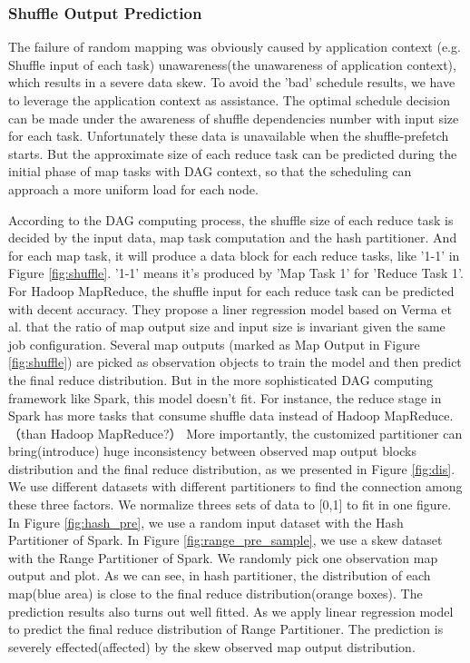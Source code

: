 \subsubsection{Shuffle Output Prediction}\label{shuffleprediction}
The failure of random mapping was obviously caused by application context (e.g. Shuffle input of each task) unawareness(the unawareness of application context), which results in a severe data skew. To avoid the 'bad' schedule results, we have to leverage the application context as assistance. The optimal schedule decision can be made under the awareness of shuffle dependencies number with input size for each task. Unfortunately these data is unavailable when the shuffle-prefetch starts. But the approximate size of each reduce task can be predicted during the initial phase of map tasks with DAG context, so that the scheduling can approach a more uniform load for each node.

According to the DAG computing process, the shuffle size of each reduce task is decided by the input data, map task computation and the hash partitioner. And for each map task, it will produce a data block for each reduce tasks, like '1-1' in Figure \ref{fig:shuffle}. '1-1' means it's produced by 'Map Task 1' for 'Reduce Task 1'. For Hadoop MapReduce, the shuffle input for each reduce task can be predicted with decent accuracy\cite{ishuffle}. They propose a liner regression model based on Verma et al.\cite{predict} that the ratio of map output size and input size is invariant given the same job configuration. Several map outputs (marked as Map Output in Figure \ref{fig:shuffle}) are picked as observation objects to train the model and then predict the final reduce distribution. But in the more sophisticated DAG computing framework like Spark, this model doesn't fit. For instance, the reduce stage in Spark has more tasks that consume shuffle data instead of Hadoop MapReduce.（than Hadoop MapReduce?） More importantly, the customized partitioner can bring(introduce) huge inconsistency between observed map output blocks distribution and the final reduce distribution, as we presented in Figure \ref{fig:dis}. We use different datasets with different partitioners to find the connection among these three factors. We normalize threes sets of data to [0,1] to fit in one figure. In Figure \ref{fig:hash_pre}, we use a random input dataset with the Hash Partitioner of Spark\cite{sparksource}. In Figure \ref{fig:range_pre_sample}, we use a skew dataset with the Range Partitioner of Spark\cite{sparksource}.
We randomly pick one observation map output and plot. As we can see, in hash partitioner, the distribution of each map(blue area) is close to the final reduce distribution(orange boxes). The prediction results also turns out well fitted. As we apply linear regression model to predict the final reduce distribution of Range Partitioner. The prediction is severely effected(affected) by the skew observed map output distribution. 

